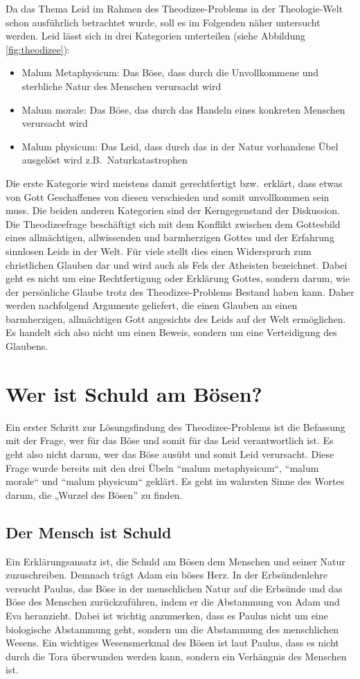 Da das Thema Leid im Rahmen des Theodizee-Problems in der Theologie-Welt schon ausführlich betrachtet wurde, soll es im Folgenden näher untersucht werden. Leid lässt sich in drei Kategorien unterteilen (siehe Abbildung \ref{fig:theodizee}):
\begin{itemize}
    \item Malum Metaphysicum: Das Böse, dass durch die Unvollkommene und sterbliche Natur des Menschen verursacht wird
    \item Malum morale: Das Böse, das durch das Handeln eines konkreten Menschen verursacht wird
    \item Malum physicum: Das Leid, dass durch das in der Natur vorhandene Übel ausgelöst wird z.B.\ Naturkatastrophen
\end{itemize}
Die erste Kategorie wird meistens damit gerechtfertigt bzw.\ erklärt, dass etwas von Gott Geschaffenes von diesen verschieden und somit unvollkommen sein muss. Die beiden anderen Kategorien sind der Kerngegenstand der Diskussion. Die Theodizeefrage beschäftigt sich mit dem Konflikt zwischen dem Gottesbild eines allmächtigen, allwissenden und barmherzigen Gottes und der Erfahrung sinnlosen Leids in der Welt. Für viele stellt dies einen Widerspruch zum christlichen Glauben dar und wird auch als \glqq Fels der Atheisten\grqq{} bezeichnet. Dabei geht es nicht um eine Rechtfertigung oder Erklärung Gottes, sondern darum, wie der persönliche Glaube trotz des Theodizee-Problems Bestand haben kann. Daher werden nachfolgend Argumente geliefert, die einen Glauben an einen barmherzigen, allmächtigen Gott angesichts des Leids auf der Welt ermöglichen. Es handelt sich also nicht um einen Beweis, sondern um eine Verteidigung des Glaubens.\\

\section{Wer ist Schuld am Bösen?}
Ein erster Schritt zur Lösungsfindung des Theodizee-Problems ist die Befassung mit der Frage, wer für das Böse und somit für das Leid verantwortlich ist. Es geht also nicht darum, wer das Böse ausübt und somit Leid verursacht. Diese Frage wurde bereits mit den drei Übeln ``malum metaphysicum``, ``malum morale`` und ``malum physicum`` geklärt. Es geht im wahrsten Sinne des Wortes darum, die „Wurzel des Bösen” zu finden.

\subsection{Der Mensch ist Schuld}
Ein Erklärungsansatz ist, die Schuld am Bösen dem Menschen und seiner Natur zuzuschreiben. Demnach trägt Adam ein böses Herz. In der Erbsündenlehre versucht Paulus, das Böse in der menschlichen Natur auf die Erbsünde und das Böse des Menschen zurückzuführen, indem er die Abstammung von Adam und Eva heranzieht. Dabei ist wichtig anzumerken, dass es Paulus nicht um eine biologische Abstammung geht, sondern um die Abstammung des menschlichen Wesens. Ein wichtiges Wesensmerkmal des Bösen ist laut Paulus, dass es nicht durch die Tora überwunden werden kann, sondern ein Verhängnis des Menschen ist. \\

